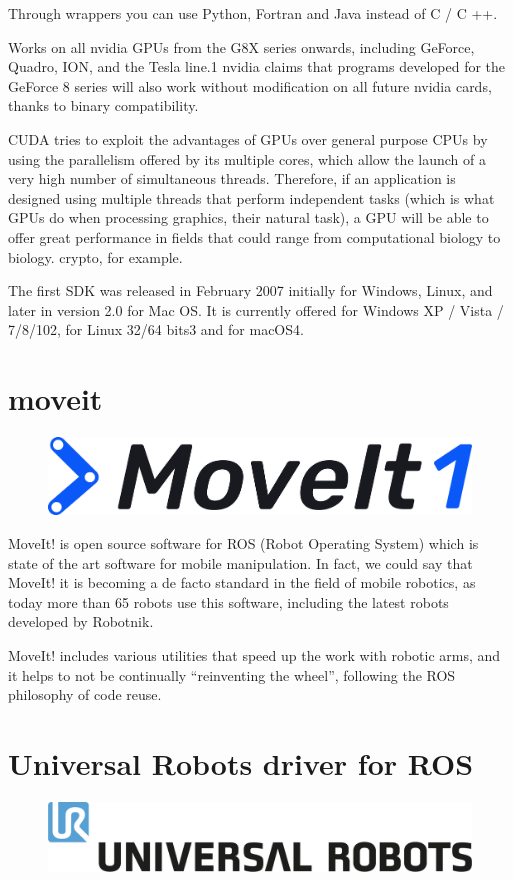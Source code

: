 		Through wrappers you can use Python, Fortran and Java instead of C / C ++.
		
		Works on all nvidia GPUs from the G8X series onwards, including GeForce, Quadro, ION, and the Tesla line.1 nvidia claims that programs developed for the GeForce 8 series will also work without modification on all future nvidia cards, thanks to binary compatibility.
		
		CUDA tries to exploit the advantages of GPUs over general purpose CPUs by using the parallelism offered by its multiple cores, which allow the launch of a very high number of simultaneous threads. Therefore, if an application is designed using multiple threads that perform independent tasks (which is what GPUs do when processing graphics, their natural task), a GPU will be able to offer great performance in fields that could range from computational biology to biology. crypto, for example.
		
		The first SDK was released in February 2007 initially for Windows, Linux, and later in version 2.0 for Mac OS. It is currently offered for Windows XP / Vista / 7/8/102, for Linux 32/64 bits3 and for macOS4.

	\section{moveit}
		\begin{figure}[h!]
			\centering
			\includegraphics[width=0.7\linewidth]{Images/logos/moveit}
			\label{fig:moveit}
		\end{figure}
	
		MoveIt! is open source software for ROS (Robot Operating System) which is state of the art software for mobile manipulation. In fact, we could say that MoveIt! it is becoming a de facto standard in the field of mobile robotics, as today more than 65 robots use this software, including the latest robots developed by Robotnik.
		
		MoveIt! includes various utilities that speed up the work with robotic arms, and it helps to not be continually “reinventing the wheel”, following the ROS philosophy of code reuse.
		
	\section{Universal Robots driver for ROS}	
		\begin{figure}[h!]
			\centering
			\includegraphics[width=0.7\linewidth]{Images/logos/ur}
			\label{fig:ur}
		\end{figure}
	

